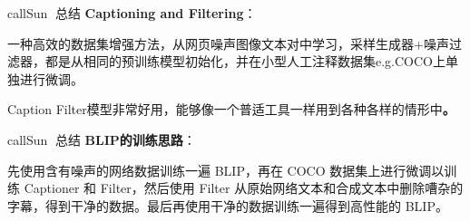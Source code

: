 \documentclass[zihao=false,fontset=windows]{ctexart}
\begin{document}
\begin{feishubox}{callSun}{🌟}
总结 \textcolor{feishuRed}{\textbf{Captioning and Filtering}}：\par
一种高效的数据集增强方法，从网页噪声图像文本对中学习，采样生成器+噪声过滤器，都是从相同的预训练模型初始化，并在小型人工注释数据集e.g.COCO上单独进行微调。\par
Caption Filter模型非常好用，能够像一个普适工具一样用到各种各样的情形中\textbf{。}\par
\end{feishubox}

\begin{feishubox}{callSun}{🌟}
总结 \textcolor{feishuRed}{\textbf{BLIP的训练思路}}：\par
先使用含有噪声的网络数据训练一遍 BLIP，再在 COCO 数据集上进行微调以训练 Captioner 和 Filter，然后使用 Filter 从原始网络文本和合成文本中删除嘈杂的字幕，得到干净的数据。最后再使用干净的数据训练一遍得到高性能的 BLIP。\par
\end{feishubox}
\end{document}
